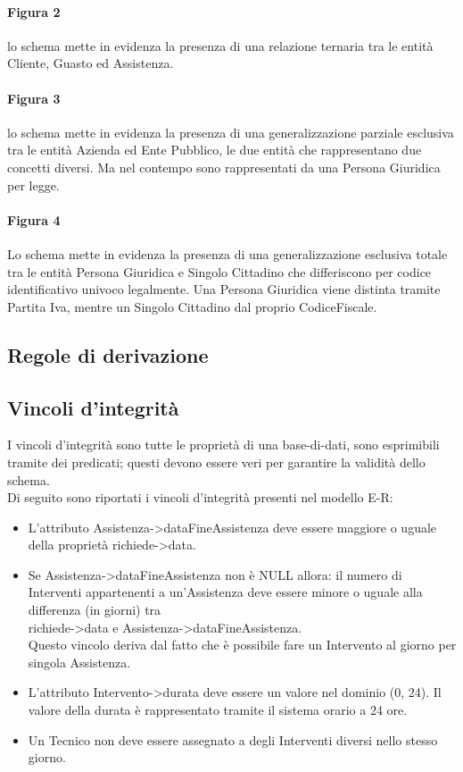 \documentclass[legalpaper]{article}
\begin{document}
\paragraph{Figura 2}
lo schema mette in evidenza la presenza di una relazione ternaria tra le entità Cliente, Guasto ed Assistenza.
\paragraph{Figura 3}
lo schema mette in evidenza la presenza di una generalizzazione parziale esclusiva tra le entità Azienda ed Ente Pubblico, le due entità che rappresentano due concetti diversi. Ma nel contempo sono rappresentati da una Persona Giuridica per legge.
\paragraph{Figura 4} Lo schema mette in evidenza la presenza di una generalizzazione esclusiva totale tra le entità Persona Giuridica e Singolo Cittadino che differiscono per codice identificativo univoco legalmente. Una Persona Giuridica viene distinta tramite Partita Iva, mentre un Singolo Cittadino dal proprio CodiceFiscale.
\newpage
\subsection{Regole di derivazione}


\subsection{Vincoli d'integrità}
I vincoli d'integrità sono tutte le proprietà di una base-di-dati, sono esprimibili 
tramite dei predicati; questi devono essere veri per garantire la validità dello schema.\\
\newline
Di seguito sono riportati i vincoli d'integrità presenti nel modello E-R:
\begin{itemize}
	\item L'attributo Assistenza->dataFineAssistenza deve essere maggiore o uguale\\ della proprietà richiede->data.
	\item Se Assistenza->dataFineAssistenza non è NULL allora: il numero di Interventi appartenenti a un'Assistenza deve essere minore o uguale alla differenza (in giorni) tra \\richiede->data e Assistenza->dataFineAssistenza.\\Questo vincolo deriva dal fatto che è possibile fare un Intervento al giorno per singola Assistenza.
	\item L'attributo Intervento->durata deve essere un valore nel dominio (0, 24).
	Il valore della durata è rappresentato tramite il sistema orario a 24 ore.
	\item Un Tecnico non deve essere assegnato a degli Interventi diversi nello stesso giorno.
	
\end{itemize}
\end{document}
